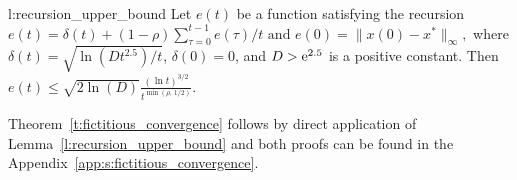 \begin{replemma}{l:recursion_upper_bound}
  Let $e(t)$ be a function satisfying the recursion
  \(
    e(t) =
    \delta(t) + (1-\rho)\sum_{\tau=0}^{t-1}e(\tau)/{t}
    \text{ and } e(0)=\|x(0) - x^*\|_{\infty},
  \)
  where \(\delta(t) = \sqrt{\ln(D t^{2.5})/t} \), \(\delta(0) = 0 \),
  and $D > \mathrm{e}^{2.5}$ is a positive constant.  Then
  \(
    e(t) \leq
    \sqrt{2 \ln(D)} \frac{(\ln t)^{3/2}}{t^{\min(\rho,\, 1/2)}}.
  \)
\end{replemma}
Theorem~\ref{t:fictitious_convergence} follows by direct application
of Lemma~\ref{l:recursion_upper_bound} and both proofs can be found
in the Appendix~\ref{app:s:fictitious_convergence}.
